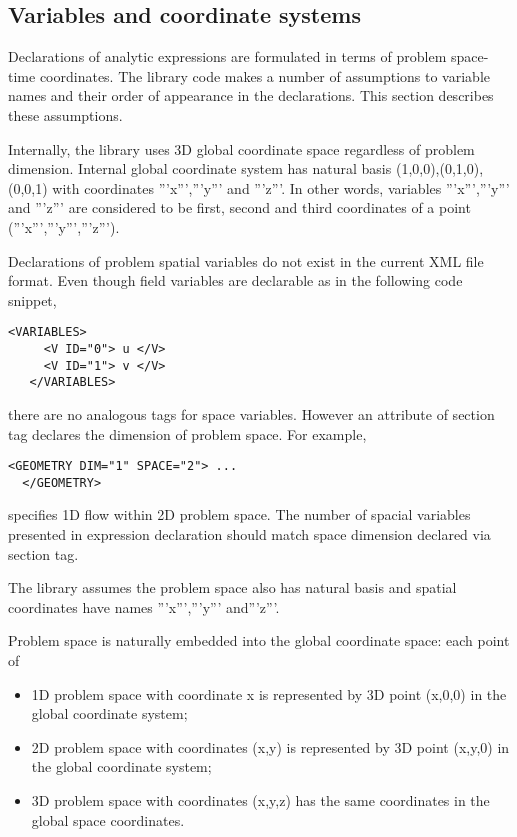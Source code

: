 \subsection{Variables and coordinate systems}
Declarations of analytic expressions are formulated in terms of problem
space-time coordinates. The library code makes a number of assumptions to
variable names and their order of appearance in the declarations. This section
describes these assumptions.

Internally, the library uses 3D global coordinate space regardless of problem
dimension. Internal global coordinate system has natural basis
{{{(1,0,0),(0,1,0),(0,0,1)}}} with coordinates '''x''','''y''' and '''z'''. In
other words, variables '''x''','''y''' and '''z''' are considered to be first,
second and third coordinates of a point ('''x''','''y''','''z''').

Declarations of problem spatial variables do not exist in the current XML file
format. Even though field variables are declarable as in the following code
snippet, 
\begin{lstlisting}[style=XMLStyle]
   <VARIABLES>
     <V ID="0"> u </V>
     <V ID="1"> v </V>
   </VARIABLES>
\end{lstlisting} 
there are no analogous tags for space variables. However an attribute
 of  section tag declares the dimension of
problem space. For example, \begin{lstlisting}[style=XMLStyle]
  <GEOMETRY DIM="1" SPACE="2"> ...
  </GEOMETRY>
\end{lstlisting}
specifies 1D flow within 2D problem space. The number of spacial variables
presented in expression declaration should match space dimension declared via
 section tag.

The library assumes the problem space also has natural basis and spatial
coordinates have names '''x''','''y''' and'''z'''.

Problem space is naturally embedded into the global coordinate space: each point
of
\begin{itemize}
\item 1D problem space with coordinate {{{x}}} is represented by 3D point
 {{{(x,0,0)}}} in the global coordinate system;
\item 2D problem space with coordinates {{{(x,y)}}} is represented by 3D point 
 {{{(x,y,0)}}} in the global coordinate system;
\item 3D problem space with coordinates {{{(x,y,z)}}} has the
 same coordinates in the global space coordinates.
\end{itemize}

